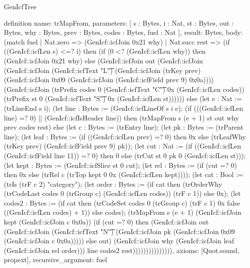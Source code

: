 \begin{lexlean}{GenIcfTree}
\begin{semanticmodule}
definition{
  name: trMapFrom,
  parameters: [
    s : Bytes,
    i : Nat,
    st : Bytes,
    out : Bytes,
    why : Bytes,
    prev : Bytes,
    codes : Bytes,
    fuel : Nat
  ],
  result: Bytes,
  body: (match fuel
    | Nat.zero => (GenIcf::icfJoin 0x21 why)
    | Nat.succ rest => (if ((GenIcf::icfLen s) <=? i) then (if (0 <? (GenIcf::icfLen why)) then (GenIcf::icfJoin 0x21 why) else (GenIcf::icfJoin out (GenIcf::icfJoin (GenIcf::icfJoin (GenIcf::icfText "L\t") (GenIcf::icfJoin (trKey prev) (GenIcf::icfJoin 0x09 (GenIcf::icfJoin (GenIcf::icfField prev 9) 0x0a)))) (GenIcf::icfJoin (trPrefix codes 0 (GenIcf::icfText "C\t") 0x (GenIcf::icfLen codes)) (trPrefix st 0 (GenIcf::icfText "S\t") 0x (GenIcf::icfLen st)))))) else (let e : Nat := (trLineEnd s i); (let line : Bytes := (GenIcf::icfLineOf s i e); (if (((GenIcf::icfLen line) =? 0) || (GenIcf::icfIsHeader line)) then (trMapFrom s (e + 1) st out why prev codes rest) else (let c : Bytes := (trEntry line); (let pk : Bytes := (trParent line); (let leaf : Bytes := (if ((GenIcf::icfLen prev) =? 0) then 0x else (trLeafWhy (trKey prev) (GenIcf::icfField prev 9) pk)); (let cut : Nat := (if ((GenIcf::icfLen (GenIcf::icfField line 11)) =? 0) then 0 else (trCut st 0 pk 0 (GenIcf::icfLen st))); (let kept : Bytes := (GenIcf::icfSlice st 0 cut); (let rel : Bytes := (if (cut =? 0) then 0x else (trRel c (trTop kept 0 0x (GenIcf::icfLen kept)))); (let cat : Bool := (trIs (trF c 2) "category"); (let order : Bytes := (if cat then (trOrderWhy (trCodeLast codes 0 (trGroup c) (GenIcf::icfLen codes)) (trF c 1)) else 0x); (let codes2 : Bytes := (if cat then (trCodeSet codes 0 (trGroup c) (trF c 1) 0x false ((GenIcf::icfLen codes) + 1)) else codes); (trMapFrom s (e + 1) (GenIcf::icfJoin kept (GenIcf::icfJoin c 0x0a)) (if (cut =? 0) then (GenIcf::icfJoin out (GenIcf::icfJoin (GenIcf::icfText "N\t") (GenIcf::icfJoin pk (GenIcf::icfJoin 0x09 (GenIcf::icfJoin c 0x0a))))) else out) (GenIcf::icfJoin why (GenIcf::icfJoin leaf (GenIcf::icfJoin rel order))) line codes2 rest))))))))))))))),
  axioms: [Quot.sound, propext],
  recursive_argument: fuel
}


\end{semanticmodule}
\end{lexlean}
